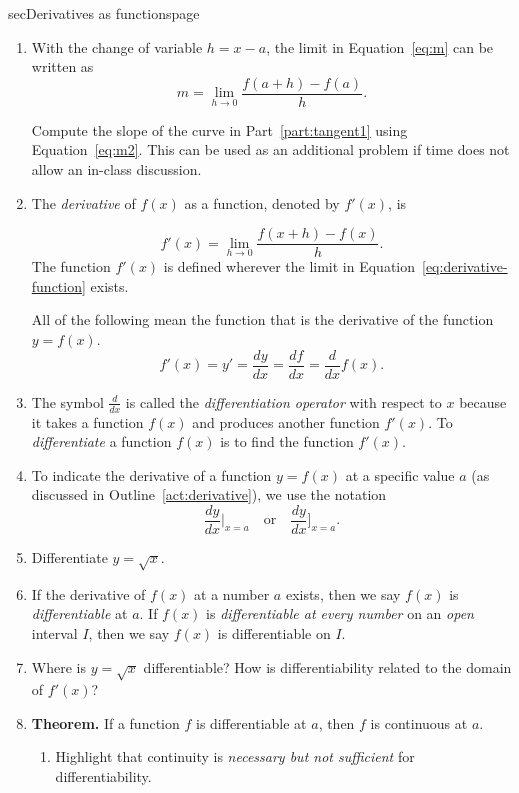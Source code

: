 \documentclass[../main]{subfiles}
\begin{document}
\begin{outline}{sec}{Derivatives as functions}{page} \label{act:derivative-as-function}
  \begin{enumerate}
    \item With the change of variable \(h = x - a\), the limit in Equation~\eqref{eq:m} can be written as
      \begin{equation} \label{eq:m2}
        m = \lim_{h \to 0} \frac{f(a + h) - f(a)}{h}.
      \end{equation}

      Compute the slope of the curve in Part~\ref{part:tangent1} using Equation~\eqref{eq:m2}.  This can be used as an additional problem if time does not allow an in-class discussion.

    \item {The \emph{derivative} of \(f(x)\) as a function, denoted by \(f'(x)\), is}
      \begin{mdframed}[style=simple]
        \begin{equation} \label{eq:derivative-function} 
          f'(x) = \lim_{h \to 0} \frac{f(x + h) - f(x)}{h}.
        \end{equation}
        The function \(f'(x)\) is defined wherever the limit in Equation~\eqref{eq:derivative-function} exists.
      \end{mdframed}
        
    All of the following mean the function that is the derivative of the function \(y = f(x)\).
      \[
        f'(x) = y' = \frac{dy}{dx} = \frac{df}{dx} = \frac{d}{dx} f(x).
      \]
    \item {The symbol \(\frac{d}{dx}\) is called the \emph{differentiation operator} with respect to \(x\) because it takes a function \(f(x)\) and produces another function \(f'(x)\). To \emph{differentiate} a function \(f(x)\) is to find the function \(f'(x)\).}
    \item {To indicate the derivative of a function \(y = f(x)\) at a specific value \(a\) (as discussed in Outline~\ref{act:derivative}), we use the notation 
        \[
          {\frac{dy}{dx}}\bigg|_{x = a} \quad\text{or}\quad {\frac{dy}{dx}}\bigg]_{x = a}.
      \]}
    \item Differentiate \(y = \sqrt{x}\).  
    \item {If the derivative of \(f(x)\) at a number \(a\) exists, then we say \(f(x)\) is \emph{differentiable} at \(a\). If \(f(x)\) is \emph{differentiable at every number} on an \emph{open} interval \(I\), then we say \(f(x)\) is differentiable on \(I\).}
    \item Where is \(y = \sqrt{x}\) differentiable? How is differentiability related to the domain of \(f'(x)\)?
    \item \textbf{Theorem.} If a function \(f\) is differentiable at \(a\), then \(f\) is continuous at \(a\).
      \begin{enumerate}
        \item Highlight that continuity is \emph{necessary but not sufficient} for differentiability.
      \end{enumerate}
      

\end{enumerate}
\end{outline}
\end{document}
